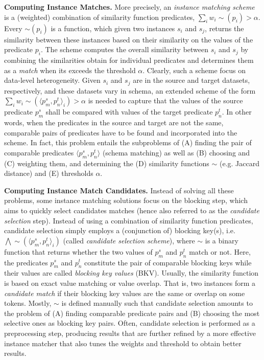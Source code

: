 \textbf{Computing Instance Matches.} More precisely, an \emph{instance matching scheme} is a (weighted) combination of similarity function predicates, $\sum_i{w_i \sim(p_i)} > \alpha$.  Every $\sim(p_i)$ is a function, which given two instances $s_i$ and $s_j$, returns the similarity between these instances based on their similarity on the values of the predicate $p_i$. The scheme computes the overall similarity between $s_i$ and $s_j$ by combining the similarities obtain for individual predicates and determines them as a \emph{match} when its exceeds the threshold $\alpha$. Clearly, such a scheme focus on data-level heterogeneity. Given $s_i$ and $s_j$ are in the source and target datasets, respectively, and these datasets vary in schema, an extended scheme of the form $\sum_i{w_i \sim(\langle p^s_m,p^t_n \rangle_i )} > \alpha$ is needed to capture that the values of the source predicate $p^s_m$ shall be compared with values of the target predicate $p^t_n$. In other words, when the predicates in the source and target are not the same, comparable pairs of predicates have to be found and incorporated into the scheme. 
In fact, this problem entails the subproblems of (A) finding the pair of comparable predicates $\langle p^s_m, p^t_n \rangle$ (schema matching) as well as (B) choosing and (C) weighting them, and determining the (D) similarity functions $\sim$ (e.g. Jaccard distance) and (E) thresholds $\alpha$.  

\textbf{Computing Instance Match Candidates.} Instead of solving all these problems, some instance matching solutions focus on the blocking step, which aims to quickly select candidates matches (hence also referred to as the \emph{candidate selection} step). Instead of using a combination of similarity function predicates, candidate selection simply employs a (conjunction of) blocking key(s), i.e. $\bigwedge \sim(\langle p^s_m,p^t_n \rangle_i)$ (called \emph{candidate selection scheme}), where $\sim$ is a binary function that returns whether the two values of $p^s_m$ and $p^t_n$ match or not. Here, the predicates $p^s_m$ and $p^t_n$ constitute the pair of comparable blocking keys while their values are called \emph{blocking key values} (BKV). Usually, the similarity function is based on exact value matching or value overlap. That is, two instances form a \emph{candidate match} if their blocking key values are the same or overlap on some tokens. 
Mostly, $\sim$ is defined manually such that candidate selection amounts to the problem of (A) finding comparable predicate pairs and (B) choosing the most selective ones as blocking key pairs. 
Often, candidate selection is performed as a preprocessing step, producing results that are further refined by a more effective instance matcher that also tunes the weights and threshold to obtain better results. 


